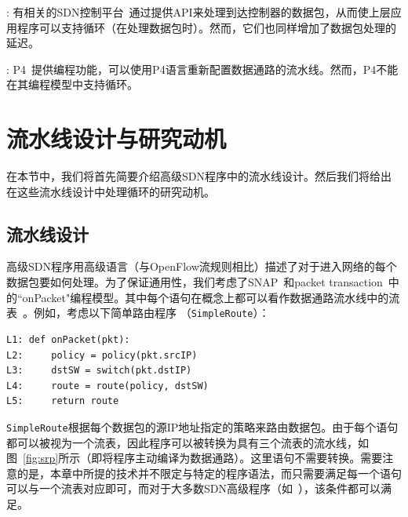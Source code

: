 : 有相关的SDN控制平台~\cite{odl,erickson2013beacon,gude2008nox,floodlight}通过提供API来处理到达控制器的数据包，从而使上层应用程序可以支持循环（在处理数据包时）。然而，它们也同样增加了数据包处理的延迟。

: P4~\cite{P4}提供编程功能，可以使用P4语言重新配置数据通路的流水线。然而，P4不能在其编程模型中支持循环。


\section{流水线设计与研究动机}
\label{sec:motivation}

在本节中，我们将首先简要介绍高级SDN程序中的流水线设计。然后我们将给出在这些流水线设计中处理循环的研究动机。

\subsection{流水线设计}
高级SDN程序用高级语言（与OpenFlow流规则相比）描述了对于进入网络的每个数据包要如何处理。为了保证通用性，我们考虑了SNAP~\cite{snap}和packet transaction~\cite{sivaraman2016packet}中的``onPacket"编程模型。其中每个语句在概念上都可以看作数据通路流水线中的流表~\cite{snap,sivaraman2016packet}。例如，考虑以下简单路由程序 （\texttt{SimpleRoute}）：

\begin{small}
\begin{verbatim}
L1: def onPacket(pkt):
L2:     policy = policy(pkt.srcIP)
L3:     dstSW = switch(pkt.dstIP)
L4:     route = route(policy, dstSW)
L5:     return route
\end{verbatim}
\end{small}

\texttt{SimpleRoute}根据每个数据包的源IP地址指定的策略来路由数据包。由于每个语句都可以被视为一个流表，因此程序可以被转换为具有三个流表的流水线，如图~\ref{fig:srp}所示（即将程序主动编译为数据通路）。这里语句不需要转换。需要注意的是，本章中所提的技术并不限定与特定的程序语法，而只需要满足每一个语句可以与一个流表对应即可，而对于大多数SDN高级程序（如~\cite{snap,sivaraman2016packet}），该条件都可以满足。

